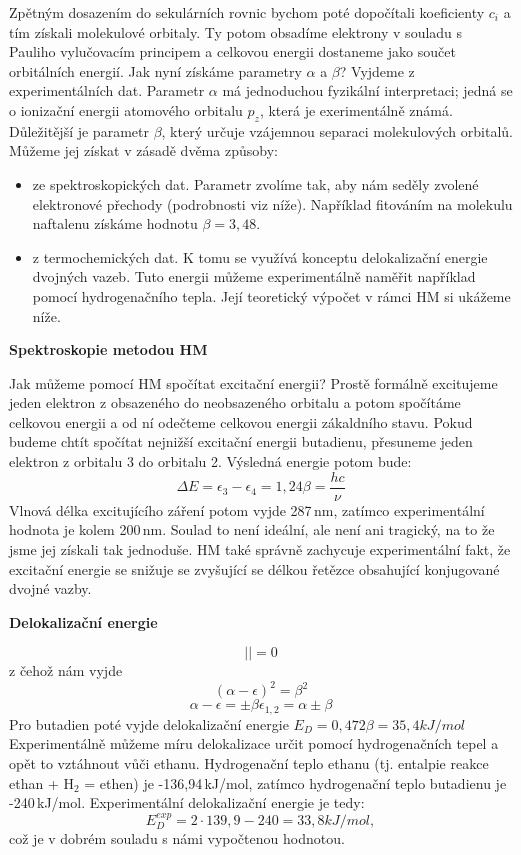 Zpětným dosazením do sekulárních rovnic bychom poté dopočítali koeficienty $c_i$ a tím získali molekulové orbitaly. Ty potom obsadíme elektrony v souladu s Pauliho vylučovacím principem a celkovou energii dostaneme jako součet orbitálních energií. 
Jak nyní získáme parametry $\alpha$ a $\beta$? Vyjdeme z experimentálních dat. Parametr $\alpha$ má jednoduchou fyzikální interpretaci; jedná se o ionizační energii atomového orbitalu $p_z$, která je exerimentálně známá. Důležitější je parametr $\beta$, který určuje vzájemnou separaci molekulových orbitalů. Můžeme jej získat v zásadě dvěma způsoby:
\begin{itemize}
\item ze spektroskopických dat. Parametr zvolíme tak, aby nám seděly zvolené elektronové přechody (podrobnosti viz níže). Například fitováním na molekulu naftalenu získáme hodnotu $\beta=3,48$.
\item z termochemických dat. K tomu se využívá konceptu delokalizační energie dvojných vazeb. Tuto energii můžeme experimentálně naměřit například pomocí hydrogenačního tepla. Její teoretický výpočet v rámci HM si ukážeme níže. 
\end{itemize}

\textbf{Spektroskopie metodou HM}

Jak můžeme pomocí HM spočítat excitační energii? Prostě formálně excitujeme jeden elektron z obsazeného do neobsazeného orbitalu a potom spočítáme celkovou energii a od ní odečteme celkovou energii zákaldního stavu. Pokud budeme chtít spočítat nejnižší excitační energii butadienu, přesuneme jeden elektron z orbitalu 3 do orbitalu 2. Výsledná energie potom bude:
$$
\Delta E = \epsilon_3-\epsilon_4 = 1,24 \beta = \frac{hc}{\nu} 
$$
Vlnová délka excitujícího záření potom vyjde 287\,nm, zatímco experimentální hodnota je kolem 200\,nm.
Soulad to není ideální, ale není ani tragický, na to že jsme jej získali tak jednoduše. HM také správně zachycuje experimentální fakt, že excitační energie se snižuje se zvyšující se délkou řetězce obsahující konjugované dvojné vazby.

\textbf{Delokalizační energie}

$$
\left| \right|=0
$$
z čehož nám vyjde
$$
(\alpha-\epsilon)^2=\beta^2
$$
$$
\alpha - \epsilon = \pm \beta
\epsilon_{1,2}= \alpha\pm \beta
$$
Pro butadien poté vyjde delokalizační energie $E_D=0,472\beta=35,4 kJ/mol$
Experimentálně můžeme míru delokalizace určit pomocí hydrogenačních tepel a opět to vztáhnout vůči ethanu.
Hydrogenační teplo ethanu (tj. entalpie reakce ethan + H$_2$ = ethen) je -136,94\,kJ/mol, zatímco hydrogenační teplo butadienu je -240\,kJ/mol. Experimentální delokalizační energie je tedy:
$$
E_D^{exp}=2\cdot139,9-240 = 33,8 kJ/mol,
$$
což je v dobrém souladu s námi vypočtenou hodnotou.

